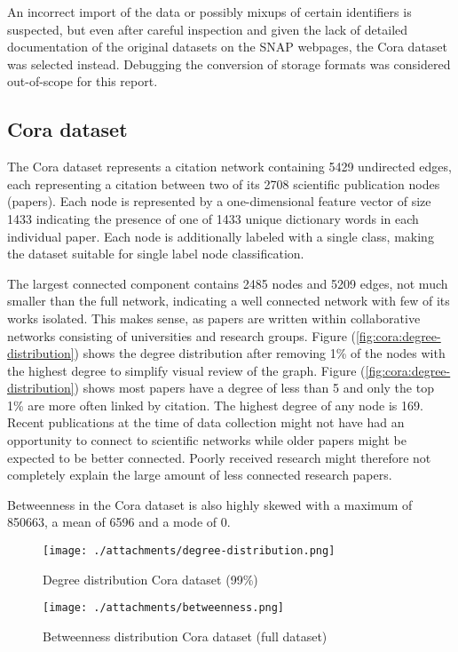 \documentclass[a4paper,10pt]{article}
\begin{document}
An incorrect import of the data or possibly mixups of certain identifiers is suspected, but even after careful inspection and given the lack of detailed documentation of the original datasets on the SNAP webpages, the Cora dataset was selected instead. Debugging the conversion of storage formats was considered out-of-scope for this report.

\subsection{Cora dataset}

The Cora dataset represents a citation network containing 5429 undirected edges, each representing a citation between two of its 2708 scientific publication nodes (papers). Each node is represented by a one-dimensional feature vector of size 1433 indicating the presence of one of 1433 unique dictionary words in each individual paper. Each node is additionally labeled with a single class, making the dataset suitable for single label node classification.

The largest connected component contains 2485 nodes and 5209 edges, not much smaller than the full network, indicating a well connected network with few of its works isolated. This makes sense, as papers are written within collaborative networks consisting of universities and research groups. Figure (\ref{fig:cora:degree-distribution}) shows the degree distribution after removing 1\% of the nodes with the highest degree to simplify visual review of the graph. Figure (\ref{fig:cora:degree-distribution}) shows most papers have a degree of less than 5 and only the top 1\% are more often linked by citation. The highest degree of any node is 169. Recent publications at the time of data collection might not have had an opportunity to connect to scientific networks while older papers might be expected to be better connected. Poorly received research might therefore not completely explain the large amount of less connected research papers.

Betweenness in the Cora dataset is also highly skewed with a maximum of 850663, a mean of 6596 and a mode of 0.

\begin{figure}[!bp]
  \centering
  \begin{minipage}[b]{0.40\textwidth}
    \texttt{[image: ./attachments/degree-distribution.png]}
    \caption{Degree distribution Cora dataset (99\%)}
    \label{fig:cora:degree-distribution}
  \end{minipage}
  \hfill
  \begin{minipage}[b]{0.40\textwidth}
    \texttt{[image: ./attachments/betweenness.png]}
    \caption{Betweenness distribution Cora dataset (full dataset)}
    \label{fig:cora:betweenness-distribution}
  \end{minipage}
\end{figure}
\end{document}
